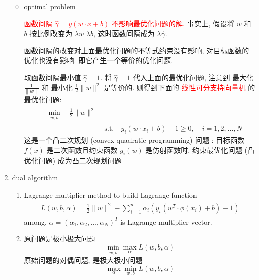 \documentclass[oneside, 12pt]{ctexbook}
\begin{document}
\begin{enumerate}
\begin{itemize}
							\item optimal problem
							
								\qquad 	\textcolor{red}{函数间隔 $\hat{\gamma} = y (w \cdot x + b)$ 不影响最优化问题的解.}  事实上, 假设将 $w$ 和 $b$ 按比例改变为 $\lambda w$ $\lambda b$, 这时函数间隔成为 $\lambda \hat{\gamma}$.
								
								\qquad 函数间隔的改变对上面最优化问题的不等式约束没有影响, 
								对目标函数的优化也没有影响. 即它产生一个等价的优化问题. 
								
								\qquad	取函数间隔最小值 $\hat{\gamma} = 1$. 将 $\hat{\gamma} = 1$ 代入上面的最优化问题, 注意到 最大化 $\frac{1}{\parallel w \parallel}$ 和 最小化 $\frac{1}{2} \parallel w \parallel ^2$ 是等价的. 则得到下面的 \textcolor{red}{线性可分支持向量机} 的最优化问题:
									\begin{align}
										\begin{split}
											&\min\limits_{w, b} \quad \frac{1}{2} \parallel w \parallel ^2
										\end{split} \label{basic_form_svm}\\
										&\text{s.t.} \quad y_i(w \cdot x_i + b) - 1 \geq 0, \quad i=1,2,...,N
									\end{align}
								\qquad 这是一个凸二次规划 (convex quadratic programming) 问题 :
								目标函数 $f(x)$ 是二次函数且约束函数 $g_i(w)$ 是仿射函数时, 约束最优化问题 (凸优化问题) 成为凸二次规划问题
						\end{itemize}
					
					\item dual algorithm
						\begin{enumerate}
							\item Lagrange multiplier method to build Lagrange function
								\begin{align}
									\begin{split}
										L(w, b, \alpha) = \frac{1}{2} \parallel w \parallel ^2 - \sum\limits_{i=1}^{n} \alpha_i (y_i (w^T \cdot \phi(x_i) + b) - 1)
									\end{split} \label{Lagrange_function}
								\end{align}
								among, $\alpha = (\alpha_1, \alpha_2, ..., \alpha_N)^T$ is Lagrange multiplier vector.
								
							\item 原问题是极小极大问题 $$\min\limits_{w,b} \max\limits_{\alpha} L(w, b, \alpha)$$
							原始问题的对偶问题, 是极大极小问题$$\max\limits_{\alpha} \min\limits_{w,b} L(w,b,\alpha)$$
							

\end{enumerate}
\end{enumerate}
\end{document}

